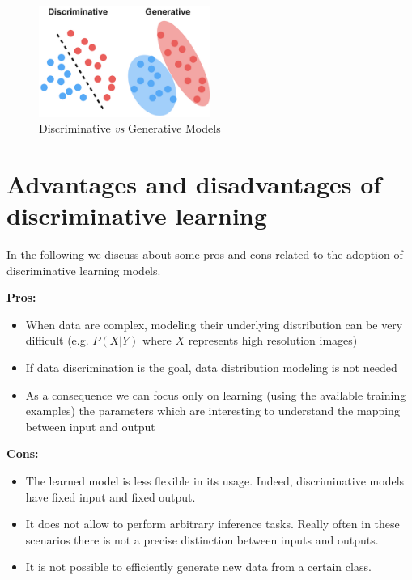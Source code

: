 \begin{figure}
    \centering
    \includegraphics[width=0.5\textwidth]{images/descriminative_generative.png}
    \caption{Discriminative \textit{vs} Generative Models}
    \label{descriminative_generative_11}
\end{figure}

\section{Advantages and disadvantages of discriminative learning}
In the following we discuss about some pros and cons related to the adoption of discriminative learning models. \newline

\textbf{Pros:}
\begin{itemize}
    \item When data are complex, modeling their underlying distribution can be very difficult (e.g. $P(X|Y)$ where $X$ represents high resolution images)
    
    \item If data discrimination is the goal, data distribution modeling is not needed
    
    \item As a consequence we can focus only on learning (using the available training examples) the parameters which are interesting to understand the mapping between input and output
\end{itemize}

\textbf{Cons:}
\begin{itemize}
    \item The learned model is less flexible in its usage. Indeed, discriminative models have fixed input and fixed output.
    
    \item It does not allow to perform arbitrary inference tasks. Really often in these scenarios there is not a precise distinction between inputs and outputs.
    
    \item It is not possible to efficiently generate new data from a certain class.
\end{itemize}


